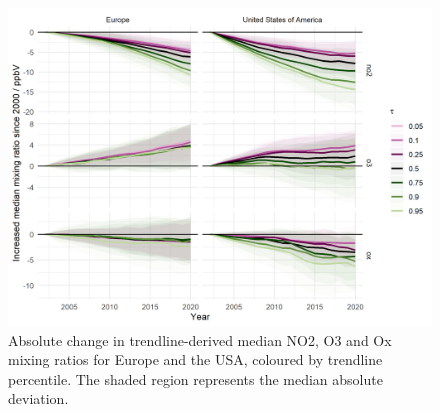 \documentclass[journal abbreviation, manuscript]{copernicus}
\begin{document}
\begin{figure}[h!]
\includegraphics[width=12cm]{plots/fixed_median_slopes_per_tau_continent_name_absolute_change_with_mad_ribbon.png}
\caption{Absolute change in trendline-derived median NO2, O3 and Ox mixing ratios for Europe and the USA, coloured by trendline percentile. The shaded region represents the median absolute deviation.}
\label{median_slopes_per_tau_cont_name_absolute}
\end{figure}
\end{document}
